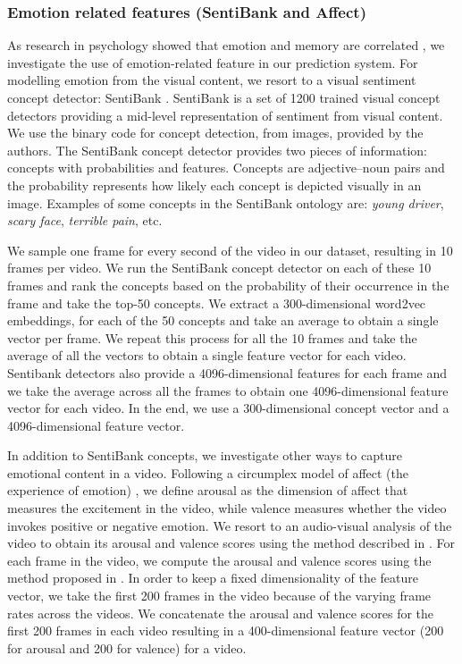 \documentclass[sigconf]{acmart}
\begin{document}
\subsubsection{Emotion related features (SentiBank and Affect)}
\label{emo-feat}
As research in psychology showed that emotion and memory are correlated \cite{emo-mem}, we investigate the use of emotion-related feature in our prediction system.
For modelling emotion from the visual content, we resort to a visual sentiment concept detector: SentiBank \cite{sb-feat}.
SentiBank is a set of 1200 trained visual concept detectors providing a mid-level representation of sentiment from visual content.
We use the binary code for concept detection, from images, provided by the authors.
The SentiBank concept detector provides two pieces of information: concepts with probabilities and features.
Concepts are adjective--noun pairs and the probability represents how likely each concept is depicted visually in an image.
Examples of some concepts in the SentiBank ontology are: \emph{young driver}, \emph{scary face}, \emph{terrible pain}, etc.

We sample one frame for every second of the video in our dataset, resulting in 10 frames per video.
We run the SentiBank concept detector on each of these 10 frames and rank the concepts based on the probability of their occurrence in the frame and take the top-50 concepts.
We extract a 300-dimensional word2vec \cite{word2vec} embeddings, for each of the 50 concepts and take an average to obtain a single vector per frame.
We repeat this process for all the 10 frames and take the average of all the vectors to obtain a single feature vector for each video.
Sentibank detectors also provide a 4096-dimensional features for each frame and we take the average across all the frames to obtain one 4096-dimensional feature vector for each video.
In the end, we use a 300-dimensional concept vector and a 4096-dimensional feature vector.

In addition to SentiBank concepts, we investigate other ways to capture emotional content in a video. 
Following a circumplex model of affect (the experience of emotion) \cite{affect-model}, we define arousal as the dimension of affect that measures the excitement in the video, while valence measures whether the video invokes positive or negative emotion.
We resort to an audio-visual analysis of the video to obtain its arousal and valence scores using the method described in \cite{affect}.
For each frame in the video, we compute the arousal and valence scores using the method proposed in \cite{affect}.
In order to keep a fixed dimensionality of the feature vector, we take the first 200 frames in the video because of the varying frame rates across the videos.
We concatenate the arousal and valence scores for the first 200 frames in each video resulting in a 400-dimensional feature vector (200 for arousal and 200 for valence) for a video.
\end{document}

